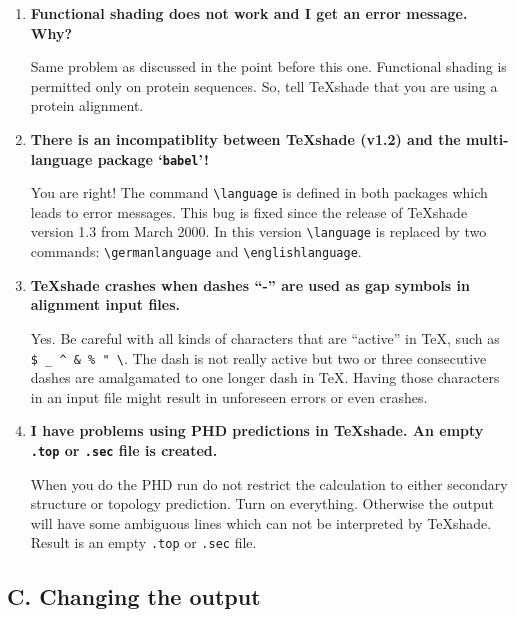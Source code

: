 \documentclass[12pt]{article}
\begin{document}
\begin{enumerate}
    
    \item
    
    \textbf{Functional shading does not work and I get an error message. Why?}
    
    Same problem as discussed in the point before this one. Functional
    shading is permitted only on protein sequences. So, tell \TeX{}shade
    that you are using a protein alignment.
    
    
    \item
    
    \textbf{There is an incompatiblity between \TeX{}shade (v1.2)
    and the multi-language package `\texttt{babel}'!}
    
    You are right! The command \verb|\language| is defined in both
    packages which leads to error messages. This bug is fixed since
    the release of \TeX{}shade version 1.3 from March 2000. In this 
    version \verb|\language| is replaced by two commands: 
    \verb|\germanlanguage| and \verb|\englishlanguage|.
    
    \item
    
    \textbf{\TeX{}shade crashes when dashes ``-'' are used as gap 
    symbols in alignment input files.}
    
    Yes. Be careful with all kinds of characters that are ``active'' 
    in \TeX{}, such as \verb|$ _ ^ & % " \|. The dash is not really active 
    but two or three consecutive dashes are amalgamated to one longer 
    dash in \TeX. Having those characters in an input file might result 
    in unforeseen errors or even crashes. 
    
    \item
    
    \textbf{I have problems using PHD predictions in \TeX{}shade. An
    empty \texttt{.top} or \texttt{.sec} file is created.}
    
    When you do the PHD run do not restrict the calculation to either
    secondary structure or topology prediction. Turn on everything. 
    Otherwise the output will have some ambiguous lines which can not 
    be interpreted by \TeX{}shade. Result is an empty 
    \texttt{.top} or \texttt{.sec} file.

\end{enumerate}



\subsection*{C. Changing the output}
\medskip 
\end{document}
